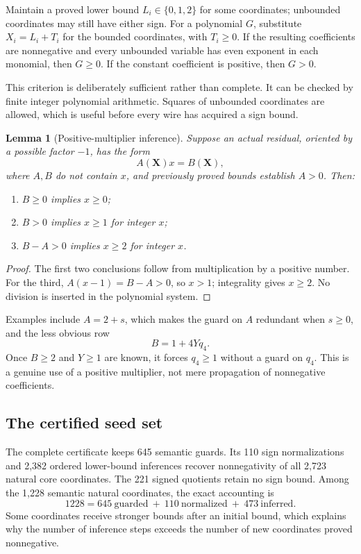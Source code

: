 \documentclass[11pt,letterpaper]{article}
\newtheorem{lemma}[theorem]{Lemma}
\theoremstyle{definition}
\begin{document}
Maintain a proved lower bound $L_i\in\{0,1,2\}$ for some coordinates;
unbounded coordinates may still have either sign. For a polynomial
$G$, substitute $X_i=L_i+T_i$ for the bounded coordinates, with
$T_i\ge0$. If the resulting coefficients are nonnegative and every
unbounded variable has even exponent in each monomial, then $G\ge0$.
If the constant coefficient is positive, then $G>0$.

This criterion is deliberately sufficient rather than complete. It
can be checked by finite integer polynomial arithmetic. Squares of
unbounded coordinates are allowed, which is useful before every wire
has acquired a sign bound.

\begin{lemma}[Positive-multiplier inference]
\label{lem:bounds}
Suppose an actual residual, oriented by a possible factor $-1$, has
the form
\[
A(\boldsymbol X)x=B(\boldsymbol X),
\]
where $A,B$ do not contain $x$, and previously proved bounds establish
$A>0$. Then:
\begin{enumerate}
\item $B\ge0$ implies $x\ge0$;
\item $B>0$ implies $x\ge1$ for integer $x$;
\item $B-A>0$ implies $x\ge2$ for integer $x$.
\end{enumerate}
\end{lemma}
\begin{proof}
The first two conclusions follow from multiplication by a positive
number. For the third, $A(x-1)=B-A>0$, so $x>1$; integrality gives
$x\ge2$. No division is inserted in the polynomial system.
\end{proof}

Examples include $A=2+s$, which makes the guard on $A$ redundant when
$s\ge0$, and the less obvious row
\[
B=1+4Yq_4.
\]
Once $B\ge2$ and $Y\ge1$ are known, it forces $q_4\ge1$ without a
guard on $q_4$. This is a genuine use of a positive multiplier, not
mere propagation of nonnegative coefficients.

\subsection{The certified seed set}

The complete certificate keeps 645 semantic guards. Its 110 sign
normalizations and 2,382 ordered lower-bound inferences recover
nonnegativity of all 2,723 natural core coordinates. The 221 signed
quotients retain no sign bound. Among the 1,228 semantic natural
coordinates, the exact accounting is
\[
1228=645\ \text{guarded}
\ +\ 110\ \text{normalized}
\ +\ 473\ \text{inferred}.
\]
Some coordinates receive stronger bounds after an initial bound, which
explains why the number of inference steps exceeds the number of new
coordinates proved nonnegative.
\end{document}
